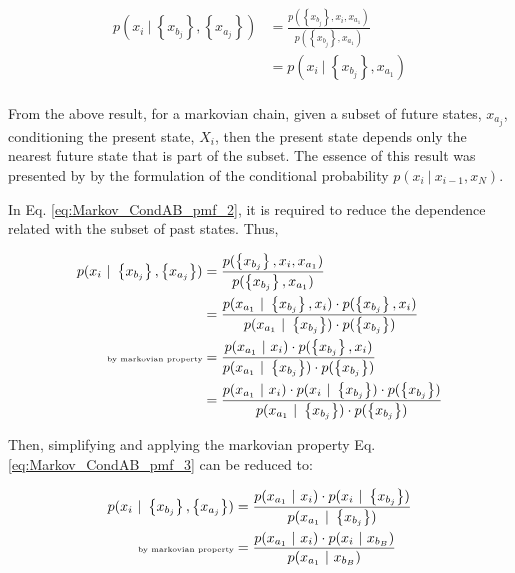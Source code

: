 \begin{align}\label{eq:Markov_CondAB_pmf_2}
 p(x_{i} \ | \ \left\{x_{b_{j}}\right\} , \left\{x_{a_{j}}\right\}) & = \frac{ p(\left\{x_{b_{j}}\right\} , x_{i}, x_{a_{1}})}{ p(\left\{x_{b_{j}}\right\} , x_{a_{1}})} \nonumber \\
            & = p(x_{i} \ | \ \left\{x_{b_{j}}\right\} , x_{a_{1}}) \nonumber \\
\end{align}


From the above result, for a markovian chain, given a subset of future states, ${x_{a_{j}}}$, conditioning the present state, $X_{i}$, then the present state depends only the nearest future state that is part of the subset. The essence of this result was presented by \cite{Elfeki2001_a} by the formulation of the conditional probability $p(x_{i} \ | \ x_{i-1} ,x_{N} )$.

In Eq. \eqref{eq:Markov_CondAB_pmf_2}, it is required to reduce the dependence related with the subset of past states. Thus,


\begin{align}\label{eq:Markov_CondAB_pmf_3}
 p(x_{i} \ | \ \left\{x_{b_{j}}\right\} , \left\{x_{a_{j}}\right\}) & = \frac{ p(\left\{x_{b_{j}}\right\} , x_{i}, x_{a_{1}})}{ p(\left\{x_{b_{j}}\right\} , x_{a_{1}})} \nonumber \\
                 & = \frac{  p(x_{a_{1}}  \ | \ \left\{x_{b_{j}}\right\} ,   x_{i} ) \cdot p(\left\{x_{b_{j}}\right\} ,   x_{i} )   }{      p(x_{a_{1}} \ | \ \left\{x_{b_{j}}\right\} ) \cdot p(\left\{x_{b_{j}}\right\}  ) } \nonumber \\
				\text{\tiny{by markovian property}}  & = \frac{  p(x_{a_{1}}  \ | \   x_{i} ) \cdot p(\left\{x_{b_{j}}\right\} ,   x_{i} )   }{      p(x_{a_{1}} \ | \ \left\{x_{b_{j}}\right\} ) \cdot p(\left\{x_{b_{j}}\right\}  ) } \nonumber \\
				  & = \frac{  p(x_{a_{1}}  \ | \   x_{i} ) \cdot p(x_{i}  \ | \ \left\{x_{b_{j}}\right\}) \cdot p(\left\{x_{b_{j}}\right\} )   }{      p(x_{a_{1}} \ | \ \left\{x_{b_{j}}\right\} ) \cdot p(\left\{x_{b_{j}}\right\}  ) } \nonumber \\
\end{align}

Then, simplifying and applying the markovian property Eq. \eqref{eq:Markov_CondAB_pmf_3} can be reduced to:


\begin{align}\label{eq:Markov_CondAB_pmf_4}
 p(x_{i} \ | \ \left\{x_{b_{j}}\right\} , \left\{x_{a_{j}}\right\}) & = \frac{  p(x_{a_{1}}  \ | \   x_{i} ) \cdot p(x_{i}  \ | \ \left\{ x_{b_{j}}\right\})  }{      p(x_{a_{1}} \ | \ \left\{x_{b_{j}}\right\} )  }  \nonumber \\
				\text{\tiny{by markovian property}}  & =  \frac{  p(x_{a_{1}}  \ | \   x_{i} ) \cdot p(x_{i}  \ | \ x_{b_{B}})  }{      p(x_{a_{1}} \ | \ x_{b_{B}} )  }  \nonumber \\
\end{align}

